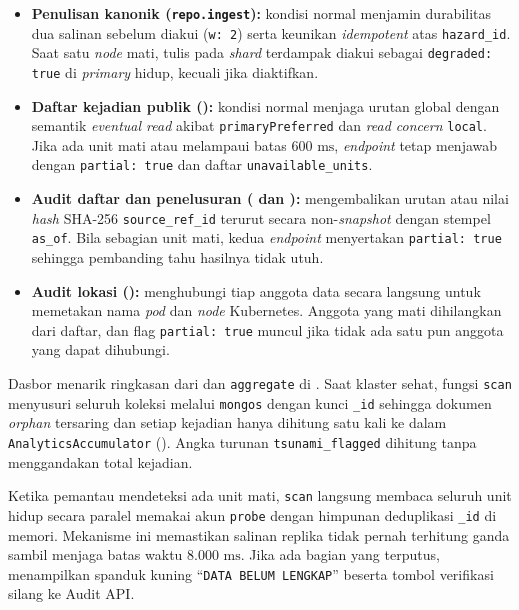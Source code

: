 \begin{itemize}
  \item \textbf{Penulisan kanonik (\texttt{repo.ingest}):} kondisi normal menjamin durabilitas dua salinan sebelum diakui (\texttt{w: 2}) serta keunikan \textit{idempotent} atas \texttt{hazard\_id}. Saat satu \textit{node} mati, tulis pada \textit{shard} terdampak diakui sebagai \texttt{degraded: true} di \textit{primary} hidup, kecuali jika  diaktifkan.
  \item \textbf{Daftar kejadian publik ():} kondisi normal menjaga urutan global  dengan semantik \textit{eventual read} akibat \texttt{primaryPreferred} dan \textit{read concern} \texttt{local}. Jika ada unit mati atau melampaui batas $600\text{ ms}$, \textit{endpoint} tetap menjawab dengan \texttt{partial: true} dan daftar \texttt{unavailable\_units}.
  \item \textbf{Audit daftar dan penelusuran ( dan ):} mengembalikan urutan  atau nilai \textit{hash} SHA-256 \texttt{source\_ref\_id} terurut secara non-\textit{snapshot} dengan stempel \texttt{as\_of}. Bila sebagian unit mati, kedua \textit{endpoint} menyertakan \texttt{partial: true} sehingga pembanding tahu hasilnya tidak utuh.
  \item \textbf{Audit lokasi ():} menghubungi tiap anggota data secara langsung untuk memetakan nama \textit{pod} dan \textit{node} Kubernetes. Anggota yang mati dihilangkan dari daftar, dan flag \texttt{partial: true} muncul jika tidak ada satu pun anggota yang dapat dihubungi.
\end{itemize}

Dasbor  menarik ringkasan dari  dan \texttt{aggregate} di . Saat klaster sehat, fungsi \texttt{scan} menyusuri seluruh koleksi melalui \texttt{mongos} dengan kunci \texttt{\_id} sehingga dokumen \textit{orphan} tersaring dan setiap kejadian hanya dihitung satu kali ke dalam \texttt{AnalyticsAccumulator} (). Angka turunan \texttt{tsunami\_flagged} dihitung tanpa menggandakan total kejadian.

Ketika pemantau mendeteksi ada unit mati, \texttt{scan} langsung membaca seluruh unit hidup secara paralel memakai akun \texttt{probe} dengan himpunan deduplikasi \texttt{\_id} di memori. Mekanisme ini memastikan salinan replika tidak pernah terhitung ganda sambil menjaga batas waktu $8.000\text{ ms}$. Jika ada bagian yang terputus,  menampilkan spanduk kuning ``\texttt{DATA BELUM LENGKAP}'' beserta tombol verifikasi silang ke Audit API.
